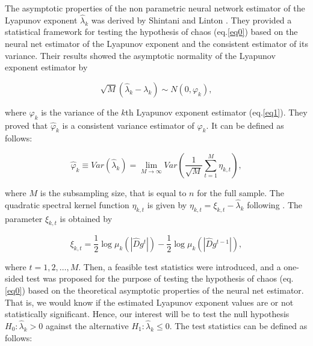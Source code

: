 The asymptotic properties of the non parametric neural network estimator of the Lyapunov exponent ${{\hat \lambda }_k}$ was derived by Shintani and Linton \cite{Shintani2004}. They provided a statistical framework for testing the hypothesis of chaos (eq.\ref{eq0}) based on the neural net estimator of the Lyapunov exponent and the consistent estimator of its variance. Their results showed the asymptotic normality of the Lyapunov exponent estimator by

\begin{equation}
\sqrt M \left( {{{\hat \lambda }_k} - {\lambda _k}} \right)\sim N\left( {0,{\varphi _k}} \right),
\label{eq:29}
\end{equation}

\noindent where ${\varphi _k}$ is the variance of the $k$th Lyapunov exponent estimator (eq.\ref{eq1}). They proved that ${{\hat \varphi }_k}$ is a consistent variance estimator of ${\varphi _k}$. It can be defined as follows:

\begin{equation}
{{\hat \varphi }_k} \equiv Var\left( {{{\hat \lambda }_k}} \right) = \mathop {\lim }\limits_{M \to \infty } Var\left( {\frac{1}{{\sqrt M }}\sum\limits_{t = 1}^M {{\eta _{k,t}}} } \right),
\label{eq:30}
\end{equation}

\noindent where $M$ is the subsampling size, that is equal to $n$ for the full sample. The quadratic spectral kernel function ${\eta _{k,t}}$ is given by ${\eta _{k,t}} = {\xi _{k,t}} - {{\hat \lambda }_k}$ following \cite{Shintani2004}. The parameter ${\xi _{k,t}}$ is obtained by

\begin{equation}
{\xi _{k,{t}}} = \frac{1}{2}\log {\mu _k}\left( {\left| {\hat D{g^{{t}}}} \right|} \right) - \frac{1}{2}\log {\mu _k}\left( {\left| {\hat D{g^{{t - 1}}}} \right|} \right),
\label{eq:31}
\end{equation}

\noindent where $t = 1,2, \ldots ,M$. Then, a feasible test statistics were introduced, and a one-sided test was proposed for the purpose of testing the hypothesis of chaos (eq.\ref{eq0}) based on the theoretical asymptotic properties of the neural net estimator. That is, we would know if the estimated Lyapunov exponent values are or not statistically significant. Hence, our interest will be to test the null hypothesis ${H_0}:{{\hat \lambda }_k} > 0$ against the alternative ${H_1}:{{\hat \lambda }_k} \leqslant 0$. The test statistics can be defined as follows:

